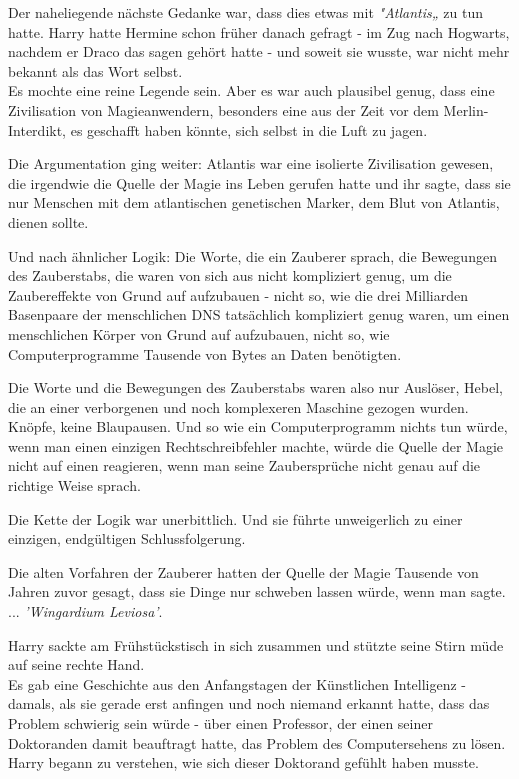 {Der naheliegende nächste Gedanke war, dass dies etwas mit \emph{"Atlantis„} zu tun hatte. Harry hatte Hermine schon früher danach gefragt - im Zug nach Hogwarts, nachdem er Draco das sagen gehört hatte - und soweit sie wusste, war nicht mehr bekannt als das Wort selbst.\\ Es mochte eine reine Legende sein. Aber es war auch plausibel genug, dass eine Zivilisation von Magieanwendern, besonders eine aus der Zeit vor dem Merlin-Interdikt, es geschafft haben könnte, sich selbst in die Luft zu jagen.

Die Argumentation ging weiter: Atlantis war eine isolierte Zivilisation gewesen, die irgendwie die Quelle der Magie ins Leben gerufen hatte und ihr sagte, dass sie nur Menschen mit dem atlantischen genetischen Marker, dem Blut von Atlantis, dienen sollte.

Und nach ähnlicher Logik: Die Worte, die ein Zauberer sprach, die Bewegungen des Zauberstabs, die waren von sich aus nicht kompliziert genug, um die Zaubereffekte von Grund auf aufzubauen - nicht so, wie die drei Milliarden Basenpaare der menschlichen DNS tatsächlich kompliziert genug waren, um einen menschlichen Körper von Grund auf aufzubauen, nicht so, wie Computerprogramme Tausende von Bytes an Daten benötigten.

Die Worte und die Bewegungen des Zauberstabs waren also nur Auslöser, Hebel, die an einer verborgenen und noch komplexeren Maschine gezogen wurden.\\ Knöpfe, keine Blaupausen. Und so wie ein Computerprogramm nichts tun würde, wenn man einen einzigen Rechtschreibfehler machte, würde die Quelle der Magie nicht auf einen reagieren, wenn man seine Zaubersprüche nicht genau auf die richtige Weise sprach.

Die Kette der Logik war unerbittlich. Und sie führte unweigerlich zu einer einzigen, endgültigen Schlussfolgerung.

Die alten Vorfahren der Zauberer hatten der Quelle der Magie Tausende von Jahren zuvor gesagt, dass sie Dinge nur schweben lassen würde, wenn man sagte.\\ ... \emph{'Wingardium Leviosa'}.

Harry sackte am Frühstückstisch in sich zusammen und stützte seine Stirn müde auf seine rechte Hand.\\ Es gab eine Geschichte aus den Anfangstagen der Künstlichen Intelligenz - damals, als sie gerade erst anfingen und noch niemand erkannt hatte, dass das Problem schwierig sein würde - über einen Professor, der einen seiner Doktoranden damit beauftragt hatte, das Problem des Computersehens zu lösen.\\ Harry begann zu verstehen, wie sich dieser Doktorand gefühlt haben musste.

}
